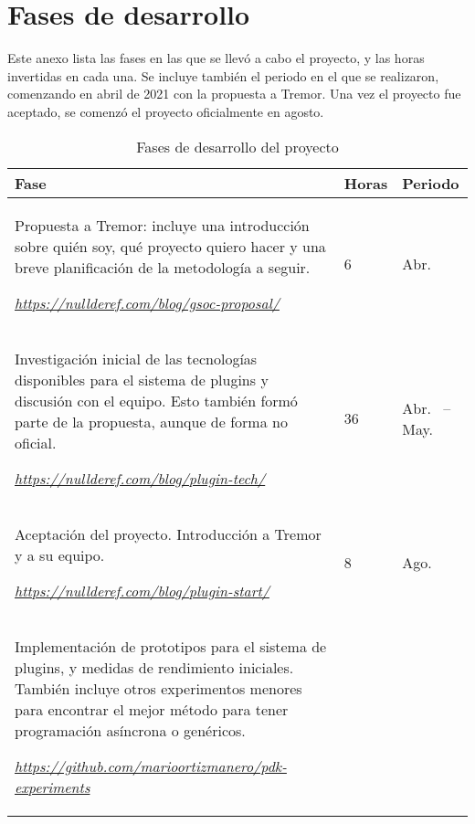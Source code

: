 \chapter{Fases de desarrollo}\label{annex:hours}

Este anexo lista las fases en las que se llevó a cabo el proyecto, y las horas
invertidas en cada una. Se incluye también el periodo en el que se realizaron,
comenzando en abril de 2021 con la propuesta a Tremor. Una vez el proyecto fue
aceptado, se comenzó el proyecto oficialmente en agosto.


\begin{longtable}[H]{| m{9.7cm} | P{1.3cm} | P{3.4cm} |}
\caption{Fases de desarrollo del proyecto}\\

\hline
\textbf{Fase}
    & \textbf{Horas}
    & \textbf{Periodo} \\
\hline
\endhead

Propuesta a Tremor: incluye una introducción sobre quién soy, qué proyecto
quiero hacer y una breve planificación de la metodología a seguir.

\vspace{4mm}
\emph{\url{https://nullderef.com/blog/gsoc-proposal/}}
    & 6
    & Abr.~ \\

\hline
Investigación inicial de las tecnologías disponibles para el sistema de
plugins y discusión con el equipo. Esto también formó parte de la propuesta,
aunque de forma no oficial.

\vspace{4mm}
\emph{\url{https://nullderef.com/blog/plugin-tech/}}
    & 36
    & Abr.~ -- May.~ \\

\hline
Aceptación del proyecto. Introducción a Tremor y a su equipo.

\vspace{4mm}
\emph{\url{https://nullderef.com/blog/plugin-start/}}
    & 8
    & Ago.~ \\

\hline
Implementación de prototipos para el sistema de plugins, y medidas de
rendimiento iniciales. También incluye otros experimentos menores para encontrar
el mejor método para tener programación asíncrona o genéricos.

\vspace{4mm}
\emph{\url{https://github.com/marioortizmanero/pdk-experiments}}


\end{longtable}

